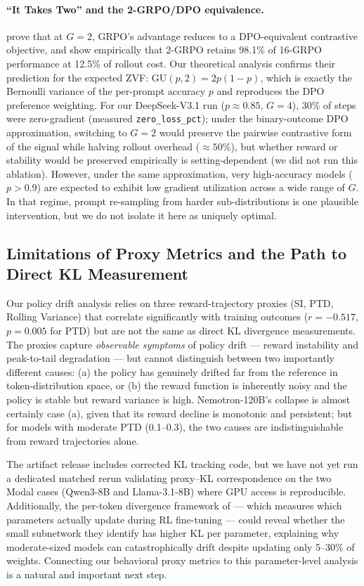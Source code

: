 \documentclass{article}
\begin{document}
\paragraph{``It Takes Two'' and the 2-GRPO/DPO equivalence.}
\citet{wu2025grpo_dpo} prove that at $G = 2$, GRPO's advantage reduces to a
DPO-equivalent contrastive objective, and show empirically that 2-GRPO retains
98.1\% of 16-GRPO performance at 12.5\% of rollout cost.
Our theoretical analysis confirms their prediction for the expected ZVF:
$\mathrm{GU}(p, 2) = 2p(1-p)$, which is exactly the Bernoulli variance of
the per-prompt accuracy $p$ and reproduces the DPO preference weighting.
For our DeepSeek-V3.1 run ($p \approx 0.85$, $G = 4$), 30\% of steps were
zero-gradient (measured \texttt{zero\_loss\_pct}); under the binary-outcome DPO
approximation, switching to $G = 2$ would preserve the pairwise contrastive form
of the signal while halving rollout overhead ($\approx 50\%$), but whether reward
or stability would be preserved empirically is setting-dependent (we did not run
this ablation).
However, under the same approximation, very high-accuracy models
($p > 0.9$) are expected to exhibit low gradient utilization across a wide
range of $G$. In that regime, prompt re-sampling from harder
sub-distributions is one plausible intervention, but we do not isolate it
here as uniquely optimal.

\subsection{Limitations of Proxy Metrics and the Path to Direct KL Measurement}
\label{sec:discuss_kl}

Our policy drift analysis relies on three reward-trajectory proxies (SI, PTD,
Rolling Variance) that correlate significantly with training outcomes
($r = -0.517$, $p = 0.005$ for PTD) but are not the same as direct KL
divergence measurements.
The proxies capture \emph{observable symptoms} of policy drift --- reward
instability and peak-to-tail degradation --- but cannot distinguish between
two importantly different causes: (a) the policy has genuinely drifted far from
the reference in token-distribution space, or (b) the reward function is
inherently noisy and the policy is stable but reward variance is high.
Nemotron-120B's collapse is almost certainly case (a), given that its reward
decline is monotonic and persistent; but for models with moderate PTD (0.1--0.3),
the two causes are indistinguishable from reward trajectories alone.

The artifact release includes corrected KL tracking code, but we have not yet
run a dedicated matched rerun validating proxy--KL correspondence on the two
Modal cases (Qwen3-8B and Llama-3.1-8B) where GPU access is reproducible.
Additionally, the per-token divergence framework of \citet{liu2025rlsubnetworks}
--- which measures which parameters actually update during RL fine-tuning ---
could reveal whether the small subnetwork they identify has higher KL per
parameter, explaining why moderate-sized models can catastrophically drift
despite updating only 5--30\% of weights.
Connecting our behavioral proxy metrics to this parameter-level analysis is a
natural and important next step.
\end{document}
